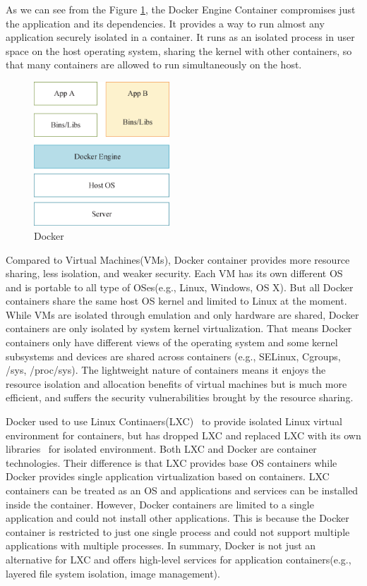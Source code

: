 As we can see from the Figure \ref{fig:Dockeroverview}, the Docker Engine Container compromises just the application and its dependencies. It provides a way to run almost any application securely isolated in a container. It runs as an isolated process in user space on the host operating system, sharing the kernel with other containers, so that many containers are allowed to run simultaneously on the host. 
\begin{figure}[t]
  \centering
  \includegraphics[width=2in]{figs/docker.eps}
  \caption{Docker}
  \label{fig:Dockeroverview}
\end{figure}

Compared to Virtual Machines(VMs), Docker container provides more resource sharing, less isolation, and weaker security. Each VM has its own different OS and  is portable to all type of OSes(e.g., Linux, Windows, OS X). But all Docker containers share the same host OS kernel and limited to Linux at the moment. While VMs are isolated through emulation and only hardware are shared, Docker containers are only isolated by system kernel virtualization. That means Docker containers only have different views of the operating system and some kernel subsystems and devices are shared across containers (e.g., SELinux, Cgroups, /sys, /proc/sys). The lightweight nature of containers means it enjoys the resource isolation and allocation benefits of virtual machines but is much more efficient, and suffers the security vulnerabilities brought by the resource sharing.

Docker used to use Linux Continaers(LXC)~\cite{helsley2009lxc} to provide isolated Linux virtual environment for containers, but has dropped LXC and replaced LXC with its own libraries~\cite{droplxc} for isolated environment. Both LXC and Docker are container technologies. Their difference is that LXC provides base OS containers while Docker provides single application virtualization based on containers. LXC containers can be treated as an OS and applications and services can be installed inside the container. However, Docker containers are limited to a single application and could not install other applications. This is because the Docker container is restricted to just one single process and could not support multiple applications with multiple processes. In summary, Docker is not just an alternative for LXC and offers high-level services for application containers(e.g., layered file system isolation, image management).

